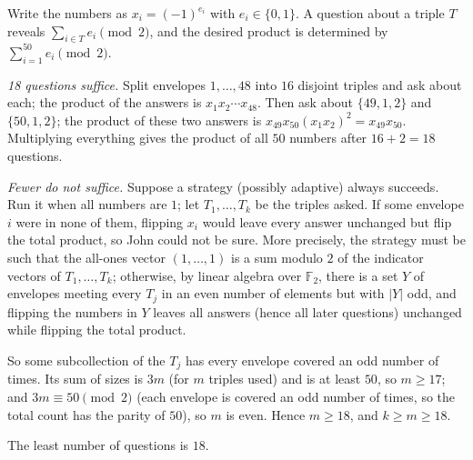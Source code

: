 Write the numbers as \(x_i=(-1)^{e_i}\) with \(e_i\in\{0,1\}\). A question about a triple \(T\) reveals \(\sum_{i\in T}e_i \pmod 2\), and the desired product is determined by \(\sum_{i=1}^{50}e_i\pmod 2\).

\emph{18 questions suffice.} Split envelopes \(1,\dots,48\) into \(16\) disjoint triples and ask about each; the product of the answers is \(x_1x_2\cdots x_{48}\). Then ask about \(\{49,1,2\}\) and \(\{50,1,2\}\); the product of these two answers is \(x_{49}x_{50}(x_1x_2)^2=x_{49}x_{50}\). Multiplying everything gives the product of all \(50\) numbers after \(16+2=18\) questions.

\emph{Fewer do not suffice.} Suppose a strategy (possibly adaptive) always succeeds. Run it when all numbers are \(1\); let \(T_1,\dots,T_k\) be the triples asked. If some envelope \(i\) were in none of them, flipping \(x_i\) would leave every answer unchanged but flip the total product, so John could not be sure. More precisely, the strategy must be such that the all-ones vector \((1,\dots,1)\) is a sum modulo \(2\) of the indicator vectors of \(T_1,\dots,T_k\); otherwise, by linear algebra over \(\mathbb{F}_2\), there is a set \(Y\) of envelopes meeting every \(T_j\) in an even number of elements but with \(|Y|\) odd, and flipping the numbers in \(Y\) leaves all answers (hence all later questions) unchanged while flipping the total product.

So some subcollection of the \(T_j\) has every envelope covered an odd number of times. Its sum of sizes is \(3m\) (for \(m\) triples used) and is at least \(50\), so \(m\ge17\); and \(3m\equiv 50\pmod 2\) (each envelope is covered an odd number of times, so the total count has the parity of \(50\)), so \(m\) is even. Hence \(m\ge18\), and \(k\ge m\ge18\).

The least number of questions is \(\boxed{18}\).
